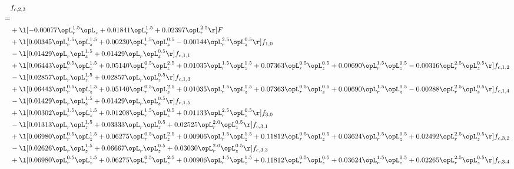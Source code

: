 \begin{alignat}{2} 
\label{eq:f_23_1} 
& f_{c,2,3} \nonumber \\ 
 = \\ 
& + \l[  -0.00077 \opL_r^{1.5} \opL_z +  0.01841 \opL_r^{1.5} +  0.02397 \opL_r^{2.5}  \r] F \nonumber \\ 
& + \l[  0.00345 \opL_r^{1.5} \opL_z^{1.5} +  0.00230 \opL_r^{1.5} \opL_z^{0.5}   -0.00144 \opL_r^{2.5} \opL_z^{0.5}  \r] f_{1,0} \nonumber \\ 
& - \l[  0.01429 \opL_r \opL_z^{1.5} +  0.01429 \opL_r \opL_z^{0.5}  \r] f_{c,1,1} \nonumber \\ 
& + \l[  0.06443 \opL_r^{0.5} \opL_z^{1.5} +  0.05140 \opL_r^{0.5} \opL_z^{2.5} +  0.01035 \opL_r^{1.5} \opL_z^{1.5} +  0.07363 \opL_r^{0.5} \opL_z^{0.5} +  0.00690 \opL_r^{1.5} \opL_z^{0.5}   -0.00316 \opL_r^{2.5} \opL_z^{0.5}  \r] f_{c,1,2} \nonumber \\ 
& - \l[  0.02857 \opL_r \opL_z^{1.5} +  0.02857 \opL_r \opL_z^{0.5}  \r] f_{c,1,3} \nonumber \\ 
& + \l[  0.06443 \opL_r^{0.5} \opL_z^{1.5} +  0.05140 \opL_r^{0.5} \opL_z^{2.5} +  0.01035 \opL_r^{1.5} \opL_z^{1.5} +  0.07363 \opL_r^{0.5} \opL_z^{0.5} +  0.00690 \opL_r^{1.5} \opL_z^{0.5}   -0.00288 \opL_r^{2.5} \opL_z^{0.5}  \r] f_{c,1,4} \nonumber \\ 
& - \l[  0.01429 \opL_r \opL_z^{1.5} +  0.01429 \opL_r \opL_z^{0.5}  \r] f_{c,1,5} \nonumber \\ 
& + \l[  0.00302 \opL_r^{1.5} \opL_z^{1.5} +  0.01208 \opL_r^{1.5} \opL_z^{0.5} +  0.01133 \opL_r^{2.5} \opL_z^{0.5}  \r] f_{3,0} \nonumber \\ 
& - \l[  0.01313 \opL_r \opL_z^{1.5} +  0.03333 \opL_r \opL_z^{0.5} +  0.02525 \opL_r^{2.0} \opL_z^{0.5}  \r] f_{c,3,1} \nonumber \\ 
& + \l[  0.06980 \opL_r^{0.5} \opL_z^{1.5} +  0.06275 \opL_r^{0.5} \opL_z^{2.5} +  0.00906 \opL_r^{1.5} \opL_z^{1.5} +  0.11812 \opL_r^{0.5} \opL_z^{0.5} +  0.03624 \opL_r^{1.5} \opL_z^{0.5} +  0.02492 \opL_r^{2.5} \opL_z^{0.5}  \r] f_{c,3,2} \nonumber \\ 
& - \l[  0.02626 \opL_r \opL_z^{1.5} +  0.06667 \opL_r \opL_z^{0.5} +  0.03030 \opL_r^{2.0} \opL_z^{0.5}  \r] f_{c,3,3} \nonumber \\ 
& + \l[  0.06980 \opL_r^{0.5} \opL_z^{1.5} +  0.06275 \opL_r^{0.5} \opL_z^{2.5} +  0.00906 \opL_r^{1.5} \opL_z^{1.5} +  0.11812 \opL_r^{0.5} \opL_z^{0.5} +  0.03624 \opL_r^{1.5} \opL_z^{0.5} +  0.02265 \opL_r^{2.5} \opL_z^{0.5}  \r] f_{c,3,4} \nonumber \\ 

\end{alignat}
